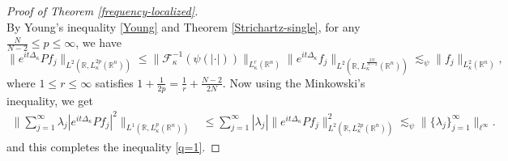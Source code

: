 \documentclass[a4paper,11pt, reqno]{amsart}
\numberwithin{equation}{section}
\theoremstyle{plain}
\theoremstyle{definition}
\theoremstyle{remark}
\begin{document}
\begin{proof}[Proof of Theorem \ref{frequency-localized}]
\begin{equation*}
\end{equation*}
By Young's inequality \eqref{Young} and Theorem \ref{Strichartz-single},   for any $\frac{N}{N-2}\leq p\leq\infty$, we have
\begin{equation*}
\|e^{it\Delta_\kappa}Pf_j\|_{L^{2}(\mathbb{R},L_\kappa^{2p}(\mathbb{R}^n))}\leq \|\mathcal{F}^{-1}_\kappa (\psi(|\cdot|))\|_{L_\kappa^r(\mathbb{R}^n)} \|e^{it\Delta_\kappa}f_j\|_{L^{2}(\mathbb{R},L_\kappa^{\frac{2N}{N-2}}(\mathbb{R}^n))}\lesssim_\psi \|f_j\|_{L_\kappa^2(\mathbb{R}^n)},
\end{equation*}
where $1\leq r\leq\infty$ satisfies $1+\frac{1}{2p}=\frac{1}{r}+\frac{N-2}{2N}$. Now using the Minkowski's inequality, we get 
\begin{align*}
   \bigg\|\sum_{j=1}^\infty \lambda_j|e^{it\Delta_\kappa}Pf_j|^2\bigg\|_{L^1(\mathbb{R}, L_\kappa^p(\mathbb{R}^n))}&\leq    \sum_{j=1}^\infty |\lambda_j| \|e^{it\Delta_\kappa}Pf_j\|_{L^{2}(\mathbb{R},L_\kappa^{2p}(\mathbb{R}^n))}^2\lesssim_\psi \|\{\lambda_j\}^\infty_{j=1}\|_{\ell^\infty}. 
\end{align*}
and this completes the inequality \eqref{q=1}.


\end{proof}
\end{document}
